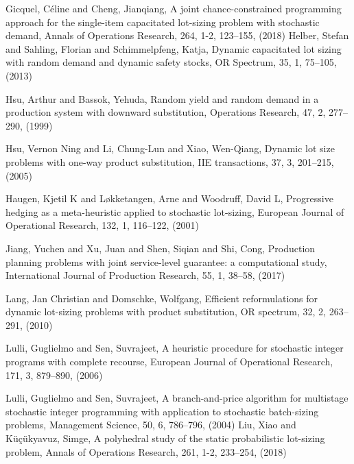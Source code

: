 \documentclass[10pt]{article}
\begin{document}
\begin{thebibliography}{99}
Gicquel, C{\'e}line and Cheng, Jianqiang, A joint chance-constrained programming approach for the single-item capacitated lot-sizing problem with stochastic demand, Annals of Operations Research, 264, 1-2, 123--155, (2018)
 Helber, Stefan and Sahling, Florian and Schimmelpfeng, Katja, Dynamic capacitated lot sizing with random demand and dynamic safety stocks, OR Spectrum, 35, 1, 75--105, (2013)
 

Hsu, Arthur and Bassok, Yehuda, Random yield and random demand in a production system with downward substitution, Operations Research, 47, 2, 277--290,
  (1999)
  
Hsu, Vernon Ning and Li, Chung-Lun and Xiao, Wen-Qiang, Dynamic lot size problems with one-way product substitution, IIE transactions, 37, 3, 201--215, (2005)

Haugen, Kjetil K and L{\o}kketangen, Arne and Woodruff, David L, Progressive hedging as a meta-heuristic applied to stochastic lot-sizing, European Journal of Operational Research, 132, 1, 116--122, (2001)


 
 Jiang, Yuchen and Xu, Juan and Shen, Siqian and Shi, Cong, Production planning problems with joint service-level guarantee: a computational study, International Journal of Production Research, 55, 1, 38--58,
 (2017)
 
 Lang, Jan Christian and Domschke, Wolfgang, Efficient reformulations for dynamic lot-sizing problems with product substitution, OR spectrum,
32, 2, 263--291, (2010)

 Lulli, Guglielmo and Sen, Suvrajeet, A heuristic procedure for stochastic integer programs with complete recourse, European Journal of Operational Research,
171, 3, 879--890, (2006)

Lulli, Guglielmo and Sen, Suvrajeet, A branch-and-price algorithm for multistage stochastic integer programming with application to stochastic batch-sizing problems, Management Science, 50, 6, 786--796, (2004)
Liu, Xiao and K{\"u}{\c{c}}{\"u}kyavuz, Simge, A polyhedral study of the static probabilistic lot-sizing problem, Annals of Operations Research, 261, 1-2,
233--254, (2018)


\end{thebibliography}
\end{document}
